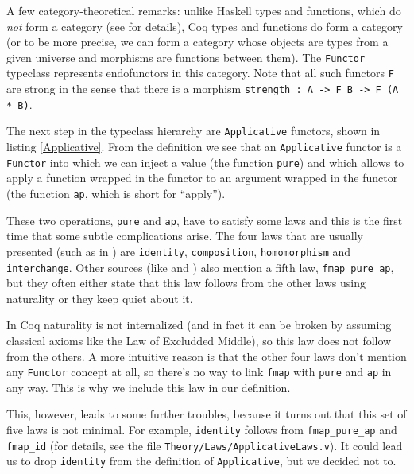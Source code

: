 \documentclass[declaration,inz,english,shortabstract]{iithesis}
\newcommand{\m}[1]{\texttt{#1}}
\begin{document}
A few category-theoretical remarks: unlike Haskell types and functions, which do \textit{not} form a category (see \cite{Hask} for details), Coq types and functions do form a category (or to be more precise, we can form a category whose objects are types from a given universe and morphisms are functions between them). The \m{Functor} typeclass represents endofunctors in this category. Note that all such functors \m{F} are strong in the sense that there is a morphism \m{strength : A -> F B -> F (A * B)}.


The next step in the typeclass hierarchy are \m{Applicative} functors, shown in listing \ref{Applicative}. From the definition we see that an \m{Applicative} functor is a \m{Functor} into which we can inject a value (the function \m{pure}) and which allows to apply a function wrapped in the functor to an argument wrapped in the functor (the function \m{ap}, which is short for ``apply'').

These two operations, \m{pure} and \m{ap}, have to satisfy some laws and this is the first time that some subtle complications arise. The four laws that are usually presented (such as in \cite{LYAH}) are \m{identity}, \m{composition}, \m{homomorphism} and \m{interchange}. Other sources (like \cite{HackageApplicative} and \cite{WikibooksApplicative}) also mention a fifth law, \m{fmap\_pure\_ap}, but they often either state that this law follows from the other laws using naturality or they keep quiet about it.

In Coq naturality is not internalized (and in fact it can be broken by assuming classical axioms like the Law of Excludded Middle), so this law does not follow from the others. A more intuitive reason is that the other four laws don't mention any \m{Functor} concept at all, so there's no way to link \m{fmap} with \m{pure} and \m{ap} in any way. This is why we include this law in our definition.

This, however, leads to some further troubles, because it turns out that this set of five laws is not minimal. For example, \m{identity} follows from \m{fmap\_pure\_ap} and \m{fmap\_id} (for details, see the file \m{Theory/Laws/ApplicativeLaws.v}). It could lead us to drop \m{identity} from the definition of \m{Applicative}, but we decided not to.
\end{document}
